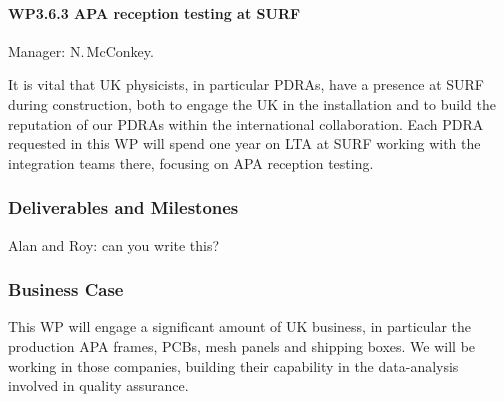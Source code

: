 \paragraph{WP3.6.3 APA reception testing at SURF} Manager: N.\,McConkey.

It is vital that UK physicists, in particular PDRAs, have a presence at SURF during construction, both to engage the UK in the installation and to build the reputation of our PDRAs within the international collaboration. Each PDRA requested in this WP will spend one year on LTA at SURF working with the integration teams there, focusing on APA reception testing.

\subsubsection{Deliverables and Milestones}

Alan and Roy: can you write this?

\subsubsection{Business Case}

This WP will engage a significant amount of UK business, in particular the production APA frames, PCBs, mesh panels and shipping boxes. We will be working in those companies, building their capability in the data-analysis involved in quality assurance.
